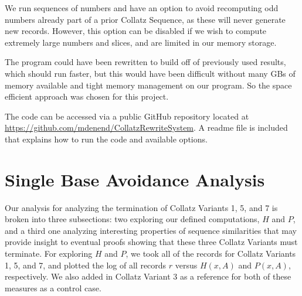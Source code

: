 We run sequences of numbers and have an option to avoid recomputing odd numbers already part of a prior Collatz Sequence, as these will never generate new records. However, this option can be disabled if we wish to compute extremely large numbers and slices, and are limited in our memory storage. \par
The program could have been rewritten to build off of previously used results, which should run faster, but this would have been difficult without many GBs of memory available and tight memory management on our program. So the space efficient approach was chosen for this project.\par
The code can be accessed via a public GitHub repository located at \url{https://github.com/mdenend/CollatzRewriteSystem}. A readme file is included that explains how to run the code and available options.
\section{Single Base Avoidance Analysis} \label{subsec:algsinglebase}
Our analysis for analyzing the termination of Collatz Variants 1, 5, and 7 is broken into three subsections: two exploring our defined computations, $H$ and $P$, and a third one analyzing interesting properties of sequence similarities that may provide insight to eventual proofs showing that these three Collatz Variants must terminate.
For exploring $H$ and $P$, we took all of the records for Collatz Variants 1, 5, and 7, and plotted the log of all records $r$ versus $H(x,A)$ and $P(x,A)$, respectively. We also added in Collatz Variant 3 as a reference for both of these measures as a control case.
